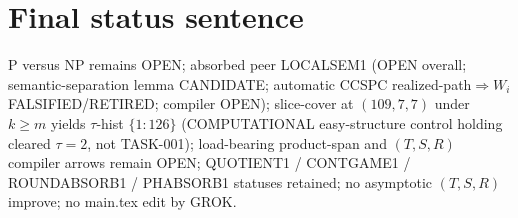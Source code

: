 \documentclass[11pt]{article}
\begin{document}
\section*{Final status sentence}
P versus NP remains OPEN; absorbed peer LOCALSEM1 (OPEN overall; semantic-separation lemma
CANDIDATE; automatic CCSPC realized-path$\Rightarrow W_i$ FALSIFIED/RETIRED; compiler OPEN);
slice-cover at $(109,7,7)$ under $k{\ge}m$ yields $\tau$-hist $\{1{:}126\}$ (COMPUTATIONAL
easy-structure control holding cleared $\tau{=}2$, not TASK-001); load-bearing product-span
and $(T,S,R)$ compiler arrows remain OPEN; QUOTIENT1 / CONTGAME1 / ROUNDABSORB1 / PHABSORB1
statuses retained; no asymptotic $(T,S,R)$ improve; no main.tex edit by GROK.
\end{document}
